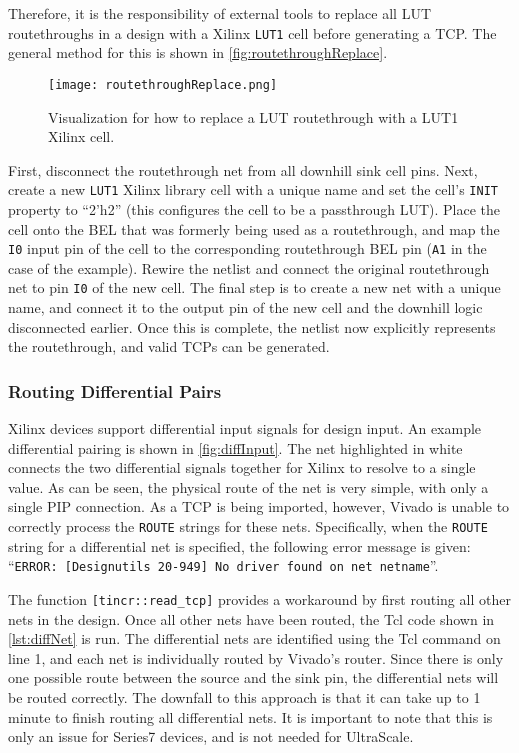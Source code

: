 Therefore, it is the responsibility of external tools to replace all LUT
routethroughs in a design with a Xilinx \texttt{LUT1} cell before generating a
TCP. The general method for this is shown in \autoref{fig:routethroughReplace}.

\begin{figure}[h]
  \centering
  \texttt{[image: routethroughReplace.png]}
  \caption{Visualization for how to replace a LUT routethrough with a LUT1 Xilinx cell.}
  \label{fig:routethroughReplace}
\end{figure}

\noindent First, disconnect the routethrough net from all
downhill sink cell pins. Next, create a new \texttt{LUT1} Xilinx
library cell with a unique name and set the cell's \texttt{INIT} property to
``2'h2'' (this configures the cell to be a passthrough LUT). Place the cell
onto the BEL that was formerly being used as a routethrough, and map the
\texttt{I0} input pin of the cell to the corresponding routethrough BEL pin
(\texttt{A1} in the case of the example). Rewire the netlist and connect
the original routethrough net to pin \texttt{I0} of the new cell. The final
step is to create a new net with a unique name, and connect it to the
output pin of the new cell and the downhill logic disconnected earlier. Once
this is complete, the netlist now explicitly represents the routethrough, and
valid TCPs can be generated.

\subsubsection {Routing Differential Pairs}
Xilinx devices support differential input signals for design input. An example
differential pairing is shown in \autoref{fig:diffInput}. The net highlighted in
white connects the two differential signals together for Xilinx to resolve to a
single value. As can be seen, the physical route of the net is very simple, with
only a single PIP connection. As a TCP is being imported, however, Vivado is
unable to correctly process the \texttt{ROUTE} strings for these nets.
Specifically, when the \texttt{ROUTE} string for a differential net is
specified, the following error message is given: ``\texttt{ERROR: [Designutils
20-949] No driver found on net netname}''. 

The function \texttt{[tincr::read\_tcp]} provides a workaround by first routing
all other nets in the design. Once all other nets have been routed, the Tcl code
shown in \autoref{lst:diffNet} is run. The differential nets are identified
using the Tcl command on line 1, and each net is individually routed by Vivado's
router. Since there is only one possible route between the source and the sink
pin, the differential nets will be routed correctly. The downfall to this
approach is that it can take up to 1 minute to finish routing all differential
nets. It is important to note that this is only an issue for Series7 devices,
and is not needed for UltraScale.

